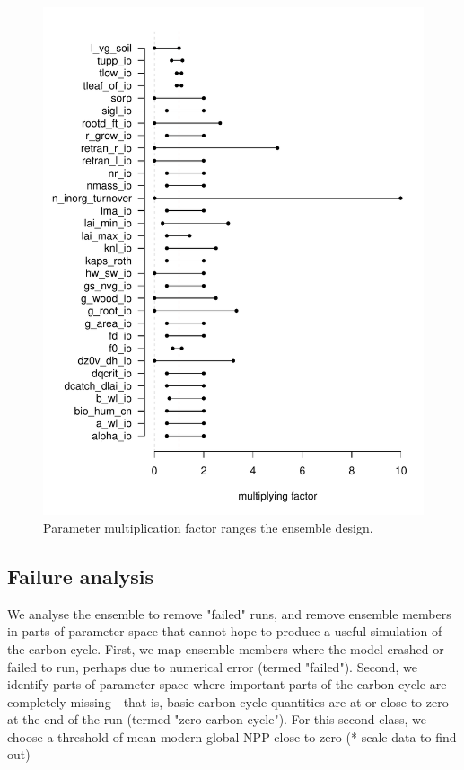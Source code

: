 \documentclass[gmd, manuscript]{copernicus}
\begin{document}
\begin{figure}[t]
\includegraphics[width=12cm]{./graphics/lhs_range.pdf}
\caption{Parameter multiplication factor ranges the ensemble design.}
\label{fig:lhs_range}
\end{figure}

\subsection{Failure analysis}\label{ssec:failure-analysis}

We analyse the ensemble to remove "failed" runs, and remove ensemble members in parts of parameter space that cannot hope to produce a useful simulation of the carbon cycle. First, we map ensemble members where the model crashed or failed to run, perhaps due to numerical error (termed "failed"). Second, we identify parts of parameter space where important parts of the carbon cycle are completely missing - that is, basic carbon cycle quantities are at or close to zero at the end of the run (termed "zero carbon cycle"). For this second class, we choose a threshold of mean modern global NPP close to zero (* scale data to find out)
\end{document}
